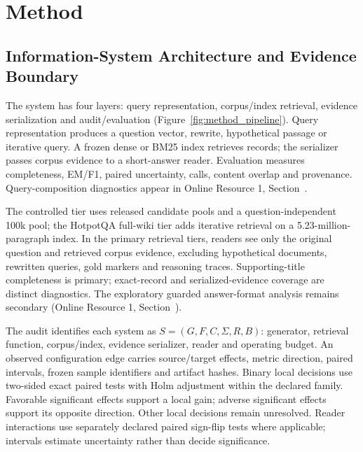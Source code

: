 \section{Method}
\label{sec:method}

\subsection{Information-System Architecture and Evidence Boundary}
\label{sec:method_overview}

The system has four layers: query representation, corpus/index retrieval, evidence serialization and audit/evaluation (Figure~\ref{fig:method_pipeline}). Query representation produces a question vector, rewrite, hypothetical passage or iterative query. A frozen dense or BM25 index retrieves records; the serializer passes corpus evidence to a short-answer reader. Evaluation measures completeness, EM/F1, paired uncertainty, calls, content overlap and provenance. Query-composition diagnostics appear in Online Resource 1, Section~.



The controlled tier uses released candidate pools and a question-independent 100k pool; the HotpotQA full-wiki tier adds iterative retrieval on a 5.23-million-paragraph index. In the primary retrieval tiers, readers see only the original question and retrieved corpus evidence, excluding hypothetical documents, rewritten queries, gold markers and reasoning traces. Supporting-title completeness is primary; exact-record and serialized-evidence coverage are distinct diagnostics. The exploratory guarded answer-format analysis remains secondary (Online Resource 1, Section~).

The audit identifies each system as $S=(G,F,C,\Sigma,R,B)$: generator, retrieval function, corpus/index, evidence serializer, reader and operating budget. An observed configuration edge carries source/target effects, metric direction, paired intervals, frozen sample identifiers and artifact hashes. Binary local decisions use two-sided exact paired tests with Holm adjustment within the declared family. Favorable significant effects support a local gain; adverse significant effects support its opposite direction. Other local decisions remain unresolved. Reader interactions use separately declared paired sign-flip tests where applicable; intervals estimate uncertainty rather than decide significance.

